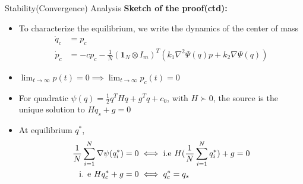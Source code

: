 \begin{frame}{Stability(Convergence) Analysis}
	\textbf{Sketch of the proof(ctd):}
	\begin{itemize}
		\item To characterize the equilibrium, we write the dynamics of the center of mass
		\begin{equation} \label{eqn: COM flocking dynamics}
		\begin{split}
		\Dot{q}_c&=p_c\\
		\Dot{p}_c&=-cp_c-\frac{1}{N}(\mathbf{1}_N\otimes I_m)^T(k_1\nabla^2\Psi(q) p +k_2 \nabla\Psi(q)) 
		\end{split}
		\end{equation}
		\pause
		\item $\lim_{t\rightarrow \infty}p(t)=0 \implies \lim_{t\rightarrow \infty}p_c(t)=0$
		\pause
		\item For quadratic $\psi(q)=\frac{1}{2}q^THq+g^Tq+c_0$, with $H\succ 0$, the source is the unique solution to $Hq_s+g=0$
		\pause
		\item At equilibrium $q^*$, 
		\begin{equation*}
		\begin{split}
		\frac{1}{N}\sum_{i=1}^{N}\nabla\psi(q_i^*)&=0 \iff \textnormal{i.e } H(\frac{1}{N}\sum_{i=1}^{N}q_i^*)+g=0\\
		\textnormal{i. e  } Hq_c^*+g&=0 \iff q_c^*=q_s
		\end{split}	
		\end{equation*}
	\end{itemize}
\end{frame}
